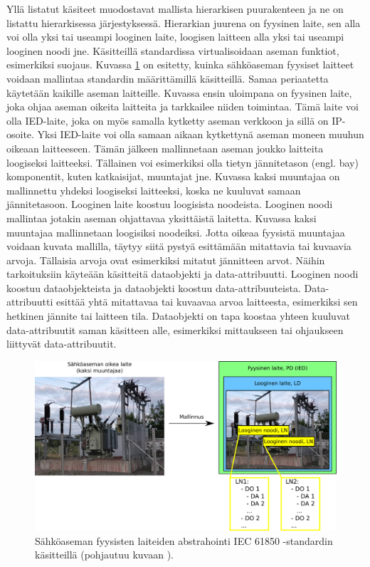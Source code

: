 Yllä listatut käsiteet muodostavat mallista hierarkisen puurakenteen ja ne on listattu hierarkisessa järjestyksessä. Hierarkian juurena on fyysinen laite, sen alla voi olla yksi tai useampi looginen laite, loogisen laitteen alla yksi tai useampi looginen noodi jne. Käsitteillä standardissa virtualisoidaan aseman funktiot, esimerkiksi suojaus. Kuvassa \ref{fig:substation-abstraction} on esitetty, kuinka sähköaseman fyysiset laitteet voidaan mallintaa standardin määrittämillä käsitteillä. Samaa periaatetta käytetään kaikille aseman laitteille. Kuvassa ensin uloimpana on fyysinen laite, joka ohjaa aseman oikeita laitteita ja tarkkailee niiden toimintaa. Tämä laite voi olla IED-laite, joka on myös samalla kytketty aseman verkkoon ja sillä on IP-osoite. Yksi IED-laite voi olla samaan aikaan kytkettynä aseman moneen muuhun oikeaan laitteeseen. Tämän jälkeen mallinnetaan aseman joukko laitteita loogiseksi laitteeksi. Tällainen voi esimerkiksi olla tietyn jännitetason (engl. bay) komponentit, kuten katkaisijat, muuntajat jne. Kuvassa kaksi muuntajaa on mallinnettu yhdeksi loogiseksi laitteeksi, koska ne kuuluvat samaan jännitetasoon. Looginen laite koostuu loogisista noodeista. Looginen noodi mallintaa jotakin aseman ohjattavaa yksittäistä laitetta. Kuvassa kaksi muuntajaa mallinnetaan loogisiksi noodeiksi. Jotta oikeaa fyysistä muuntajaa voidaan kuvata mallilla, täytyy siitä pystyä esittämään mitattavia tai kuvaavia arvoja. Tällaisia arvoja ovat esimerkiksi mitatut jännitteen arvot. Näihin tarkoituksiin käyteään käsitteitä dataobjekti ja data-attribuutti. Looginen noodi koostuu dataobjekteista ja dataobjekti koostuu data-attribuuteista. Data-attribuutti esittää yhtä mitattavaa tai kuvaavaa arvoa laitteesta, esimerkiksi sen hetkinen jännite tai laitteen tila. Dataobjekti on tapa koostaa yhteen kuuluvat data-attribuutit saman käsitteen alle, esimerkiksi mittaukseen tai ohjaukseen liittyvät data-attribuutit. \mbox{\cite[s.~2]{Camachi2017}} \mbox{\cite[s.~24]{IEC61850-1}}

\begin{figure}[ht!]
	\includegraphics[width=1\textwidth]{pictures/substation-abstraction.png}
	\caption{Sähköaseman fyysisten laiteiden abstrahointi IEC 61850 -standardin käsitteillä (pohjautuu kuvaan \mbox{\cite[s.~17]{IEC61850-7-1}}).}
	\label{fig:substation-abstraction}
\end{figure}

